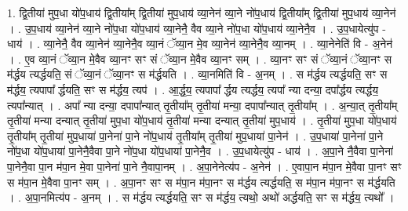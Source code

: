 \documentclass[17pt]{extarticle}
\begin{document}
1. द्वि॒तीया॑ मुप॒धा यो॑प॒धाय॑ द्वि॒तीया᳚म् द्वि॒तीया॑ मुप॒धाय॑ व्या॒नेन॑ व्या॒ने नो॑प॒धाय॑ द्वि॒तीया᳚म् द्वि॒तीया॑ मुप॒धाय॑ व्या॒नेन॑ । . उ॒प॒धाय॑ व्या॒नेन॑ व्या॒ने नो॑प॒धा यो॑प॒धाय॑ व्या॒नेनै॒ वैव व्या॒ने नो॑प॒धा यो॑प॒धाय॑ व्या॒नेनै॒व । . उ॒प॒धायेत्यु॑प - धाय॑ । . व्या॒नेनै॒ वैव व्या॒नेन॑ व्या॒नेनै॒व व्या॒नं ॅव्या॒न मे॒व व्या॒नेन॑ व्या॒नेनै॒व व्या॒नम् । . व्या॒नेनेति॑ वि - अ॒नेन॑ । . ए॒व व्या॒नं ॅव्या॒न मे॒वैव व्या॒नꣳ सꣳ सं ॅव्या॒न मे॒वैव व्या॒नꣳ सम् । . व्या॒नꣳ सꣳ सं ॅव्या॒नं ॅव्या॒नꣳ स म॑र्द्धय त्यर्द्धयति॒ सं ॅव्या॒नं ॅव्या॒नꣳ स म॑र्द्धयति । . व्या॒नमिति॑ वि - अ॒नम् । . स म॑र्द्धय त्यर्द्धयति॒ सꣳ स म॑र्द्धय॒ त्यपापा᳚ र्द्धयति॒ सꣳ स म॑र्द्धय॒ त्यप॑ । . आ॒र्द्ध॒य॒ त्यपापा᳚ र्द्धय त्यर्द्धय॒ त्यपा᳚ न्या दन्या॒ दपा᳚र्द्धय त्यर्द्धय॒ त्यपा᳚न्यात् । . अपा᳚ न्या दन्या॒ दपापा᳚न्यात् तृ॒तीया᳚म् तृ॒तीया॑ मन्या॒ दपापा᳚न्यात् तृ॒तीया᳚म् । . अ॒न्या॒त् तृ॒तीया᳚म् तृ॒तीया॑ मन्या दन्यात् तृ॒तीया॑ मुप॒धा यो॑प॒धाय॑ तृ॒तीया॑ मन्या दन्यात् तृ॒तीया॑ मुप॒धाय॑ । . तृ॒तीया॑ मुप॒धा यो॑प॒धाय॑ तृ॒तीया᳚म् तृ॒तीया॑ मुप॒धाया॑ पा॒नेना॑ पा॒ने नो॑प॒धाय॑ तृ॒तीया᳚म् तृ॒तीया॑ मुप॒धाया॑ पा॒नेन॑ । . उ॒प॒धाया॑ पा॒नेना॑ पा॒ने नो॑प॒धा यो॑प॒धाया॑ पा॒नेनै॒वैवा पा॒ने नो॑प॒धा यो॑प॒धाया॑ पा॒नेनै॒व । . उ॒प॒धायेत्यु॑प - धाय॑ । . अ॒पा॒ने नै॒वैवा पा॒नेना॑ पा॒नेनै॒वा पा॒न म॑पा॒न मे॒वा पा॒नेना॑ पा॒ने नै॒वापा॒नम् । . अ॒पा॒नेनेत्य॑प - अ॒नेन॑ । . ए॒वापा॒न म॑पा॒न मे॒वैवा पा॒नꣳ सꣳ स म॑पा॒न मे॒वैवा पा॒नꣳ सम् । . अ॒पा॒नꣳ सꣳ स म॑पा॒न म॑पा॒नꣳ स म॑र्द्धय त्यर्द्धयति॒ स म॑पा॒न म॑पा॒नꣳ स म॑र्द्धयति । . अ॒पा॒नमित्य॑प - अ॒नम् । . स म॑र्द्धय त्यर्द्धयति॒ सꣳ स म॑र्द्धय॒ त्यथो॒ अथो॑ अर्द्धयति॒ सꣳ स म॑र्द्धय॒ त्यथो᳚ । \newline
\end{document}
